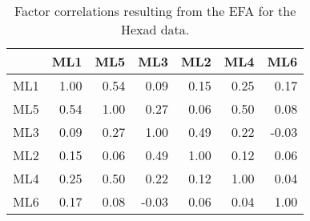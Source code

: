 \begin{table}[ht]
\centering
\begin{tabular}{rrrrrrr}
  \toprule
 & {\textbf{ML1}} & {\textbf{ML5}} & {\textbf{ML3}} & {\textbf{ML2}} & {\textbf{ML4}} & {\textbf{ML6}} \\ 
  \midrule
ML1 & 1.00 & 0.54 & 0.09 & 0.15 & 0.25 & 0.17 \\ 
  ML5 & 0.54 & 1.00 & 0.27 & 0.06 & 0.50 & 0.08 \\ 
  ML3 & 0.09 & 0.27 & 1.00 & 0.49 & 0.22 & -0.03 \\ 
  ML2 & 0.15 & 0.06 & 0.49 & 1.00 & 0.12 & 0.06 \\ 
  ML4 & 0.25 & 0.50 & 0.22 & 0.12 & 1.00 & 0.04 \\ 
  ML6 & 0.17 & 0.08 & -0.03 & 0.06 & 0.04 & 1.00 \\ 
   \bottomrule
\end{tabular}
\caption{Factor correlations resulting from the EFA for the Hexad data.} 
\label{tab:corrshex}
\end{table}
